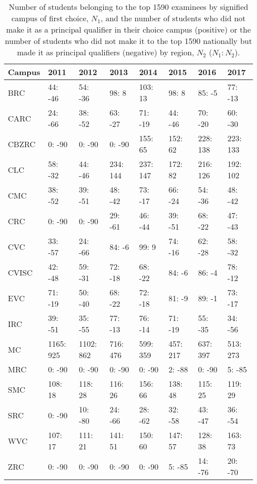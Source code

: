 \documentclass[]{article}
\begin{document}
\begin{table}

\caption{\label{tab:unnamed-chunk-5}Number of students belonging to the top 1590 examinees by signified campus of first choice, $N_1$, and the number of students who did not make it as a principal qualifier in their choice campus (positive) or the number of students who did not make it to the top 1590 nationally but made it as principal qualifiers (negative) by region, $N_2$ ($N_1: N_2$).}
\centering
\begin{tabular}[t]{llllllll}
\toprule
Campus & 2011 & 2012 & 2013 & 2014 & 2015 & 2016 & 2017\\
\midrule
BRC & 44: -46 & 54: -36 & 98: 8 & 103: 13 & 98: 8 & 85: -5 & 77: -13\\
CARC & 24: -66 & 38: -52 & 63: -27 & 71: -19 & 44: -46 & 70: -20 & 60: -30\\
CBZRC & 0: -90 & 0: -90 & 0: -90 & 155: 65 & 152: 62 & 228: 138 & 223: 133\\
CLC & 58: -32 & 44: -46 & 234: 144 & 237: 147 & 172: 82 & 216: 126 & 192: 102\\
CMC & 38: -52 & 39: -51 & 48: -42 & 73: -17 & 66: -24 & 54: -36 & 48: -42\\
\addlinespace
CRC & 0: -90 & 0: -90 & 29: -61 & 46: -44 & 39: -51 & 68: -22 & 47: -43\\
CVC & 33: -57 & 24: -66 & 84: -6 & 99: 9 & 74: -16 & 62: -28 & 58: -32\\
CVISC & 42: -48 & 59: -31 & 72: -18 & 68: -22 & 84: -6 & 86: -4 & 78: -12\\
EVC & 71: -19 & 50: -40 & 68: -22 & 72: -18 & 81: -9 & 89: -1 & 73: -17\\
IRC & 39: -51 & 35: -55 & 77: -13 & 76: -14 & 71: -19 & 55: -35 & 34: -56\\
\addlinespace
MC & 1165: 925 & 1102: 862 & 716: 476 & 599: 359 & 457: 217 & 637: 397 & 513: 273\\
MRC & 0: -90 & 0: -90 & 0: -90 & 0: -90 & 2: -88 & 0: -90 & 5: -85\\
SMC & 108: 18 & 118: 28 & 116: 26 & 156: 66 & 138: 48 & 115: 25 & 119: 29\\
SRC & 0: -90 & 10: -80 & 24: -66 & 28: -62 & 32: -58 & 43: -47 & 36: -54\\
WVC & 107: 17 & 111: 21 & 141: 51 & 150: 60 & 147: 57 & 128: 38 & 163: 73\\
ZRC & 0: -90 & 0: -90 & 0: -90 & 0: -90 & 5: -85 & 14: -76 & 20: -70\\
\bottomrule
\end{tabular}
\end{table}
\end{document}
